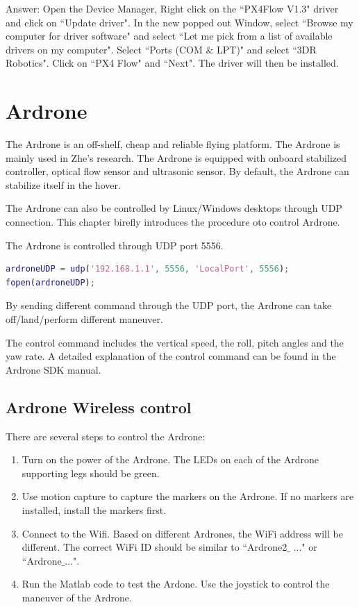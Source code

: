 \documentclass[idxtotoc,hyperref,openany]{labbook} %
\begin{document}
\begin{enumerate}
Answer: Open the Device Manager, Right click on the ``PX4Flow V1.3" driver and click on ``Update driver". In the new popped out Window, select ``Browse my computer for driver software" and select ``Let me pick from a list of available drivers on my computer". Select ``Ports (COM $\&$ LPT)" and  select ``3DR Robotics". Click on ``PX4 Flow" and ``Next". The driver will then be installed. 
\end{enumerate}

\chapter{Ardrone}
The Ardrone is an off-shelf, cheap and reliable flying platform. The Ardrone is mainly used in Zhe's research. The Ardrone is equipped with onboard stabilized controller, optical flow sensor and ultrasonic sensor. By default, the Ardrone can stabilize itself in the hover. 

The Ardrone can also be controlled by Linux/Windows desktops through UDP connection. This chapter birefly introduces the procedure oto control Ardrone. 


The Ardrone is controlled through UDP port 5556. 

\begin{lstlisting}[language=Matlab]
ardroneUDP = udp('192.168.1.1', 5556, 'LocalPort', 5556);
fopen(ardroneUDP);
\end{lstlisting}

By sending different command through the UDP port, the Ardrone can take off/land/perform different maneuver. 


The control command includes the vertical speed, the roll, pitch angles and the yaw rate. A detailed explanation of the control command can be found in the Ardrone SDK manual. 



\section{Ardrone Wireless control}

There are several steps to control the Ardrone:

\begin{enumerate}
\item Turn on the power of the Ardrone. The LEDs on each of the Ardrone supporting legs should be green. 
\item Use motion capture to capture the markers on the Ardrone. If no markers are installed, install the markers first. 
\item Connect to the Wifi. Based on different Ardrones, the WiFi address will be different. The correct WiFi ID should be similar to ``Ardrone2$\_$ ..." or ``Ardrone$\_$...".
\item Run the Matlab code to test the Ardone. Use the joystick to control the maneuver of the Ardrone. 
\end{enumerate}
\end{document}
